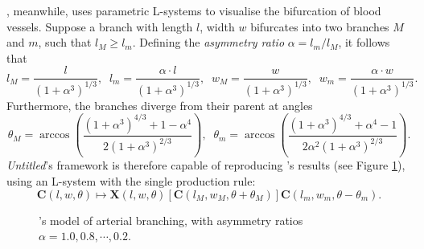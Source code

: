 \documentclass[a4paper, 11pt]{article}
\begin{document}
\begin{flushleft}
\citet{zamirArterialBranchingLSystems}, meanwhile, uses parametric L-systems to visualise the bifurcation of blood vessels. Suppose a branch with length $l$, width $w$ bifurcates into two branches $M$ and $m$, such that $l_M \geq l_m$. Defining the \textit{asymmetry ratio} $\alpha = l_m/l_M$, it follows that
$$l_M = \frac{l}{\left(1+\alpha^3\right)^{1/3}}, \;\; l_m = \frac{\alpha\cdot l}{\left(1+\alpha^3\right)^{1/3}}, \;\; w_M = \frac{w}{\left(1+\alpha^3\right)^{1/3}}, \;\; w_m = \frac{\alpha\cdot w}{\left(1+\alpha^3\right)^{1/3}}.$$
Furthermore, the branches diverge from their parent at angles
$$\theta_M = \arccos\left(\frac{\left(1+\alpha^3\right)^{4/3}+1-\alpha^4}{2\left(1+\alpha^3\right)^{2/3}}\right), \;\; \theta_m = \arccos\left(\frac{\left(1+\alpha^3\right)^{4/3}+\alpha^4-1}{2\alpha^2\left(1+\alpha^3\right)^{2/3}}\right).$$
\textit{Untitled}'s framework is therefore capable of reproducing \citeauthor{zamirArterialBranchingLSystems}'s results (see Figure \ref{Zamir Branching}), using an L-system with the single production rule:  
$$\mathbf{C}(l,w,\theta) \mapsto \mathbf{X}(l,w,\theta)[\mathbf{C}(l_M,w_M,\theta+\theta_M)]\mathbf{C}(l_m,w_m,\theta-\theta_m).$$

\begin{figure}[h]
\centering
\caption{\citeauthor{zamirArterialBranchingLSystems}'s model of arterial branching, with asymmetry ratios $\alpha = 1.0, 0.8, \cdots, 0.2$.}
\label{Zamir Branching}
\end{figure}




\end{flushleft}
\end{document}

